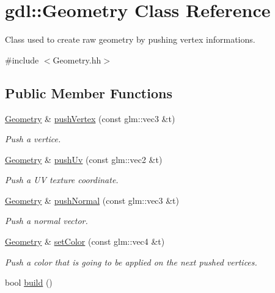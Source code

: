 \hypertarget{classgdl_1_1_geometry}{\section{gdl\-:\-:Geometry Class Reference}
\label{classgdl_1_1_geometry}
}


Class used to create raw geometry by pushing vertex informations.  




{\ttfamily \#include $<$Geometry.\-hh$>$}

\subsection*{Public Member Functions}
\begin{DoxyCompactItemize}
\item 
\hyperlink{classgdl_1_1_geometry}{Geometry} \& \hyperlink{classgdl_1_1_geometry_afb0537b5e20e5f7aed2621e8fea93f87}{push\-Vertex} (const glm\-::vec3 \&t)
\begin{DoxyCompactList}\small\item\em Push a vertice. \end{DoxyCompactList}\item 
\hyperlink{classgdl_1_1_geometry}{Geometry} \& \hyperlink{classgdl_1_1_geometry_a14d0218f49c1486b9f04de32b6533f1e}{push\-Uv} (const glm\-::vec2 \&t)
\begin{DoxyCompactList}\small\item\em Push a U\-V texture coordinate. \end{DoxyCompactList}\item 
\hyperlink{classgdl_1_1_geometry}{Geometry} \& \hyperlink{classgdl_1_1_geometry_a952a056d62627e002c3516476fd71b99}{push\-Normal} (const glm\-::vec3 \&t)
\begin{DoxyCompactList}\small\item\em Push a normal vector. \end{DoxyCompactList}\item 
\hyperlink{classgdl_1_1_geometry}{Geometry} \& \hyperlink{classgdl_1_1_geometry_abcce9e727917d430e4a68650c50c2a0e}{set\-Color} (const glm\-::vec4 \&t)
\begin{DoxyCompactList}\small\item\em Push a color that is going to be applied on the next pushed vertices. \end{DoxyCompactList}\item 
bool \hyperlink{classgdl_1_1_geometry_a6e8f3c283012d41ea72d4f091b82652d}{build} ()

\end{DoxyCompactItemize}
